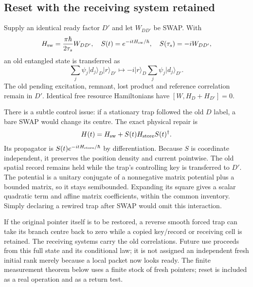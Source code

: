 \documentclass[11pt,oneside,openany]{book}
\theoremstyle{definition}
\theoremstyle{remark}\newtheorem{remark}[theorem]{Remark}
\providecommand{\ket}[1]{\lvert#1\rangle}
\begin{document}
\subsection{Reset with the receiving system retained}
Supply an identical ready factor $D'$ and let $W_{DD'}$ be SWAP. With
\begin{equation}\label{mc:eq:swap}
 H_{\rm sw}=\frac{\pi\hbar}{2\tau_s}W_{DD'},\quad
 S(t)=e^{-itH_{\rm sw}/\hbar},\quad S(\tau_s)=-iW_{DD'},
\end{equation}
an old entangled state is transferred as
\[
 \sum_j\psi_j\ket{d_j}_D\ket r_{D'}\longmapsto
 -i\ket r_D\sum_j\psi_j\ket{d_j}_{D'}.
\]
The old pending excitation, remnant, lost product and reference correlation remain in $D'$. Identical free resource Hamiltonians have $[W,H_D+H_{D'}]=0$.

There is a subtle control issue: if a stationary trap followed the old $D$ label, a bare SWAP would change its centre. The exact physical repair is
\begin{equation}\label{mc:eq:covariantreset}
 H(t)=H_{\rm sw}+S(t)H_{\rm store}S(t)^\dagger.
\end{equation}
Its propagator is $S(t)e^{-itH_{\rm store}/\hbar}$ by differentiation. Because $S$ is coordinate independent, it preserves the position density and current pointwise. The old spatial record remains held while the trap's controlling key is transferred to $D'$. The potential is a unitary conjugate of a nonnegative matrix potential plus a bounded matrix, so it stays semibounded. Expanding its square gives a scalar quadratic term and affine matrix coefficients, within the common inventory. Simply declaring a rewired trap after SWAP would omit this interaction.

If the original pointer itself is to be restored, a reverse smooth forced trap can take its branch centre back to zero while a copied key/record or receiving cell is retained. The receiving systems carry the old correlations. Future use proceeds from this full state and its conditional law; it is not assigned an independent fresh initial rank merely because a local packet now looks ready. The finite measurement theorem below uses a finite stock of fresh pointers; reset is included as a real operation and as a return test.
\end{document}
